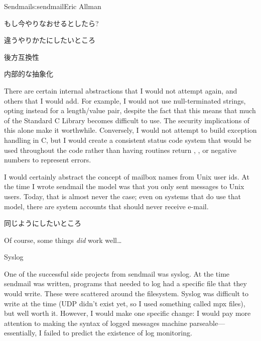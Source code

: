\begin{aosachapter}{Sendmail}{s:sendmail}{Eric Allman}
\begin{aosasect1}{もし今やりなおせるとしたら?}
\begin{aosasect2}{違うやりかたにしたいところ}
\begin{aosasect3}{後方互換性}
\end{aosasect3}

\begin{aosasect3}{内部的な抽象化}

There are certain internal abstractions that I would not attempt
again, and others that I would add. For example, I would not use
null-terminated strings, opting instead for a length/value pair,
despite the fact that this means that much of the Standard C Library
becomes difficult to use. The security implications of this alone make
it worthwhile. Conversely, I would not attempt to build exception
handling in C, but I would create a consistent status code system that
would be used throughout the code rather than having routines return
, , or negative numbers to represent errors.

I would certainly abstract the concept of mailbox names from Unix user
ids. At the time I wrote sendmail the model was that you only sent
messages to Unix users. Today, that is almost never the case; even on
systems that do use that model, there are system accounts that should
never receive e-mail.

\end{aosasect3}

\end{aosasect2}

\begin{aosasect2}{同じようにしたいところ}

Of course, some things \emph{did} work well\ldots

\begin{aosasect3}{Syslog}

One of the successful side projects from sendmail was syslog. At the
time sendmail was written, programs that needed to log had a specific
file that they would write. These were scattered around the
filesystem.  Syslog was difficult to write at the time (UDP didn't
exist yet, so I used something called mpx files), but well worth
it. However, I would make one specific change: I would pay more
attention to making the syntax
of logged messages
machine parseable---essentially, I
failed to predict the existence of log monitoring.

\end{aosasect3}


\end{aosasect2}
\end{aosasect1}
\end{aosachapter}
